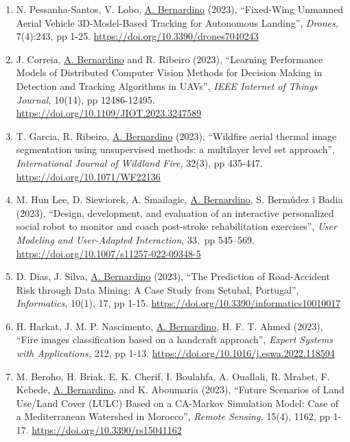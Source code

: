 \documentclass[
]{article}
\begin{document}
\begin{enumerate}
  R. P. de Figueiredo, \ul{A. Bernardino} (2023), ``An overview of
  space-variant and active vision mechanisms for resource-constrained
  human inspired robotic vision'', \emph{Autonomous Robots,} pp 1-17.
  \url{https://doi.org/10.1007/s10514-023-10107-7}~
\item
  N. Pessanha-Santos, V. Lobo, \ul{A. Bernardino} (2023), ``Fixed-Wing
  Unmanned Aerial Vehicle 3D-Model-Based Tracking for Autonomous
  Landing'', \emph{Drones,} 7(4):243, pp 1-25.
  \url{https://doi.org/10.3390/drones7040243}~
\item
  J. Correia, \ul{A. Bernardino} and R. Ribeiro (2023), ``Learning
  Performance Models of Distributed Computer Vision Methods for Decision
  Making in Detection and Tracking Algorithms in UAVs'', \emph{IEEE
  Internet of Things Journal,} 10(14), pp 12486-12495.
  \url{https://doi.org/10.1109/JIOT.2023.3247589}~
\item
  T. Garcia, R. Ribeiro, \ul{A. Bernardino} (2023), ``Wildfire aerial
  thermal image segmentation using unsupervised methods: a multilayer
  level set approach'', \emph{International Journal of Wildland Fire,}
  32(3), pp 435-447. \url{https://doi.org/10.1071/WF22136}~
\item
  M. Hun Lee, D. Siewiorek, A. Smailagic, \ul{A. Bernardino}, S.
  Bermúdez i Badia (2023), ``Design, development, and evaluation of an
  interactive personalized social robot to monitor and coach post-stroke
  rehabilitation exercises'', \emph{User Modeling and User-Adapted
  Interaction}, 33,~pp 545--569.
  \url{https://doi.org/10.1007/s11257-022-09348-5}~
\item
  D. Dias, J. Silva, \ul{A. Bernardino} (2023), ``The Prediction of
  Road-Accident Risk through Data Mining: A Case Study from Setubal,
  Portugal'', \emph{Informatics,} 10(1), 17, pp 1-15.
  \url{https://doi.org/10.3390/informatics10010017}
\item
  H. Harkat, J. M. P. Nascimento, \ul{A. Bernardino}, H. F. T. Ahmed
  (2023), ``Fire images classification based on a handcraft approach'',
  \emph{Expert Systems with Applications,} 212, pp 1-13.
  \url{https://doi.org/10.1016/j.eswa.2022.118594}~
\item
  M. Beroho, H. Briak, E. K. Cherif, I. Boulahfa, A. Ouallali, R.
  Mrabet, F. Kebede, \ul{A. Bernardino}, and K. Aboumaria (2023),
  ``Future Scenarios of Land Use/Land Cover (LULC) Based on a CA-Markov
  Simulation Model: Case of a Mediterranean Watershed in Morocco'',
  \emph{Remote Sensing,} 15(4), 1162, pp 1-17.
  \url{https://doi.org/10.3390/rs15041162}~

\end{enumerate}
\end{document}
